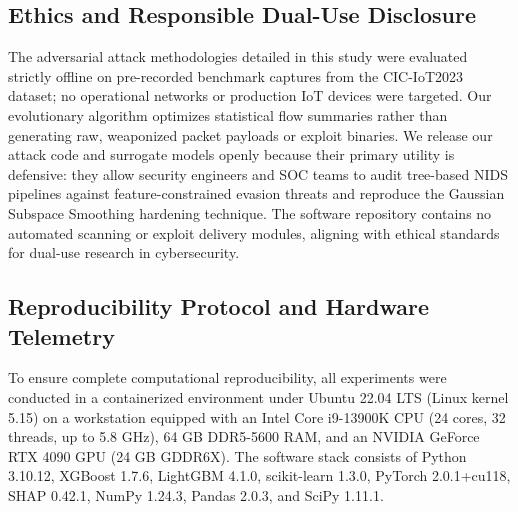 \documentclass[iicol,pdflatex,sn-mathphys-num]{sn-jnl}
\begin{document}
\subsection{Ethics and Responsible Dual-Use Disclosure}
\label{sec:ethics}
The adversarial attack methodologies detailed in this study were evaluated strictly offline on pre-recorded benchmark captures from the CIC-IoT2023 dataset; no operational networks or production IoT devices were targeted. Our evolutionary algorithm optimizes statistical flow summaries rather than generating raw, weaponized packet payloads or exploit binaries. We release our attack code and surrogate models openly because their primary utility is defensive: they allow security engineers and SOC teams to audit tree-based NIDS pipelines against feature-constrained evasion threats and reproduce the Gaussian Subspace Smoothing hardening technique. The software repository contains no automated scanning or exploit delivery modules, aligning with ethical standards for dual-use research in cybersecurity.

\subsection{Reproducibility Protocol and Hardware Telemetry}
\label{sec:reproducibility}
To ensure complete computational reproducibility, all experiments were conducted in a containerized environment under Ubuntu 22.04 LTS (Linux kernel 5.15) on a workstation equipped with an Intel Core i9-13900K CPU (24 cores, 32 threads, up to 5.8 GHz), 64 GB DDR5-5600 RAM, and an NVIDIA GeForce RTX 4090 GPU (24 GB GDDR6X). The software stack consists of Python 3.10.12, XGBoost 1.7.6, LightGBM 4.1.0, scikit-learn 1.3.0, PyTorch 2.0.1+cu118, SHAP 0.42.1, NumPy 1.24.3, Pandas 2.0.3, and SciPy 1.11.1. 
\end{document}
